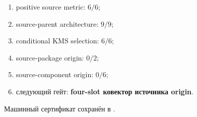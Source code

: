 \begin{protocol}\begin{enumerate}
\item positive source metric: \textbf{$6/6$};
\item source-parent architecture: \textbf{$9/9$};
\item conditional KMS selection: \textbf{$6/6$};
\item source-package origin: \textbf{$0/2$};
\item source-component origin: \textbf{$0/6$};
\item следующий гейт: \textbf{four-slot ковектор источника origin}.
\end{enumerate}\end{protocol}

Машинный сертификат сохранён в
.